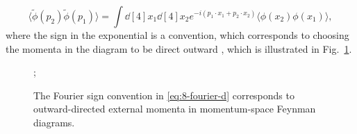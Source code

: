 \begin{example}
   \begin{equation}
     \label{eq:8-fourier-d}
     \langle \widetilde{\phi}(p_2) \widetilde{\phi}(p_1) \rangle  = \int \dd[4]{x_1} \dd[4]{x_2} e^{-i (p_1 \cdot x_1 + p_2 \cdot x_2)} \langle \phi(x_2) \phi(x_1) \rangle,
  \end{equation}
  where the sign in the exponential is a convention, which corresponds to choosing the momenta in the diagram to be direct outward \cite{brown}, which is illustrated in Fig.~\ref{fig:momconv}.
  \begin{figure}[tbhp]
    \centering
    ;
    \caption{The Fourier sign convention in \eqref{eq:8-fourier-d} corresponds to outward-directed external momenta in momentum-space Feynman diagrams.}
    \label{fig:momconv}
  \end{figure}


\end{example}
